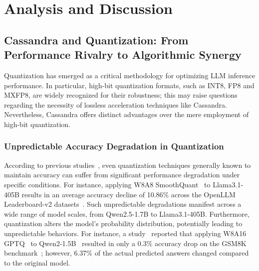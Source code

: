 \section{Analysis and Discussion}
\label{section_7}



\subsection{Cassandra and Quantization: From Performance Rivalry to Algorithmic Synergy}
\label{section_7_1}
Quantization has emerged as a critical methodology for optimizing LLM inference performance. In particular, high-bit quantization formats, such as INT8, FP8 and MXFP8, are widely recognized for their robustness; this may raise questions regarding the necessity of lossless acceleration techniques like Cassandra. Nevertheless, Cassandra offers distinct advantages over the mere employment of high-bit quantization.

\subsubsection{Unpredictable Accuracy Degradation in Quantization}
According to previous studies~\cite{Quantization-Hurts-Reasoning, llama70b-quant, llama405b-quant}, even quantization techniques generally known to maintain accuracy can suffer from significant performance degradation under specific conditions. For instance, applying W8A8 SmoothQuant~\cite{Smoothquant} to Llama3.1-405B results in an average accuracy decline of 10.86\% across the OpenLLM Leaderboard-v2 datasets~\cite{llama405b-quant}. Such unpredictable degradations manifest across a wide range of model scales, from Qwen2.5-1.7B to Llama3.1-405B. Furthermore, quantization alters the model's probability distribution, potentially leading to unpredictable behaviors. For instance, a study~\cite{Accuracy-is-Not-All-You-Need} reported that applying W8A16 GPTQ~\cite{GPTQ} to Qwen2-1.5B~\cite{Qwen2-1.5B} resulted in only a 0.3\% accuracy drop on the GSM8K benchmark~\cite{GSM8K}; however, 6.37\% of the actual predicted answers changed compared to the original model.

